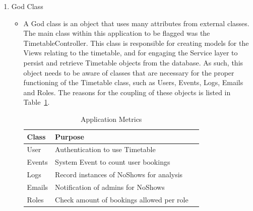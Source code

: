 \begin{enumerate}
\item God Class
\begin{itemize}
\item A God class is an object that uses many attributes from external classes. The main class within this application to be flagged was the TimetableController. This class is responsible for creating models for the Views relating to the timetable, and for engaging the Service layer to persist and retrieve Timetable objects from the database. As such, this object needs to be aware of classes that are necessary for the proper functioning of the Timetable class, such as Users, Events, Logs, Emails and Roles. The reasons for the coupling of these objects is listed in Table~\ref{fig:godclass}.
\begin{table}[H]
\begin{center}
    \begin{tabular}{| l | l | p{2.3cm} |}
    \hline
    Class & Purpose\\ \hline
	User & Authentication to use Timetable \\ \hline
	Events & System Event to count user bookings \\ \hline
	Logs & Record instances of NoShows for analysis \\ \hline
	Emails & Notification of admins for NoShows \\ \hline
	Roles & Check amount of bookings allowed per role \\ \hline	
    \end{tabular}
\end{center}
\caption{Application Metrics}
\label{fig:godclass}
\end{table}


\end{itemize}
\end{enumerate}

